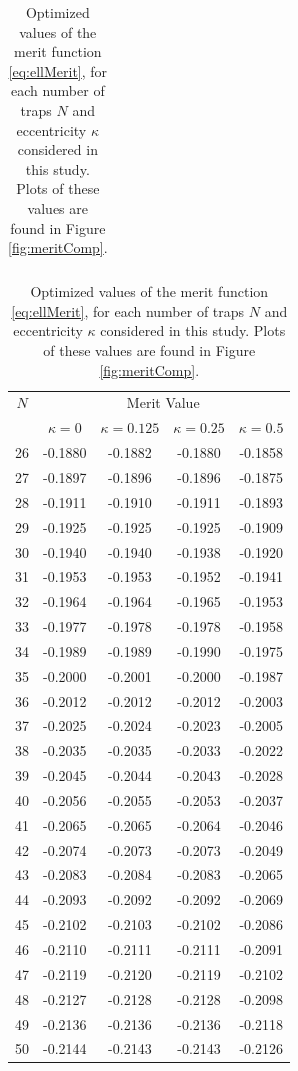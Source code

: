 \documentclass[11pt,letter,subeqn,fleqn]{article}
\newcommand{\ecc}{\kappa}
\begin{document}
\begin{table}[H]
\begin{center}
\begin{tabular}{| c | c | c | c | c |}
\hline
\end{tabular}
\begin{tabular}{| c | c | c | c | c |}
\hline
$N$    & \multicolumn{4}{c|}{Merit Value} \\
  & $\ecc = 0$ & $\ecc = 0.125$ & $\ecc = 0.25$ & $\ecc = 0.5$ \\
\hline
26 & -0.1880 & -0.1882 & -0.1880 & -0.1858 \\
27 & -0.1897 & -0.1896 & -0.1896 & -0.1875 \\
28 & -0.1911 & -0.1910 & -0.1911 & -0.1893 \\
29 & -0.1925 & -0.1925 & -0.1925 & -0.1909 \\
30 & -0.1940 & -0.1940 & -0.1938 & -0.1920 \\
31 & -0.1953 & -0.1953 & -0.1952 & -0.1941 \\
32 & -0.1964 & -0.1964 & -0.1965 & -0.1953 \\
33 & -0.1977 & -0.1978 & -0.1978 & -0.1958 \\
34 & -0.1989 & -0.1989 & -0.1990 & -0.1975 \\
35 & -0.2000 & -0.2001 & -0.2000 & -0.1987 \\
36 & -0.2012 & -0.2012 & -0.2012 & -0.2003 \\
37 & -0.2025 & -0.2024 & -0.2023 & -0.2005 \\
38 & -0.2035 & -0.2035 & -0.2033 & -0.2022 \\
39 & -0.2045 & -0.2044 & -0.2043 & -0.2028 \\
40 & -0.2056 & -0.2055 & -0.2053 & -0.2037 \\
41 & -0.2065 & -0.2065 & -0.2064 & -0.2046 \\
42 & -0.2074 & -0.2073 & -0.2073 & -0.2049 \\
43 & -0.2083 & -0.2084 & -0.2083 & -0.2065 \\
44 & -0.2093 & -0.2092 & -0.2092 & -0.2069 \\
45 & -0.2102 & -0.2103 & -0.2102 & -0.2086 \\
46 & -0.2110 & -0.2111 & -0.2111 & -0.2091 \\
47 & -0.2119 & -0.2120 & -0.2119 & -0.2102 \\
48 & -0.2127 & -0.2128 & -0.2128 & -0.2098 \\
49 & -0.2136 & -0.2136 & -0.2136 & -0.2118 \\
50 & -0.2144 & -0.2143 & -0.2143 & -0.2126 \\
\hline
\end{tabular}
\end{center}
\caption{Optimized values of the merit function \eqref{eq:ellMerit}, for each number of traps $N$ and eccentricity $\ecc$ considered in this study. Plots of these values are found in Figure \ref{fig:meritComp}.}
\label{tab:meritTable}
\end{table}
\restoregeometry
\end{document}
